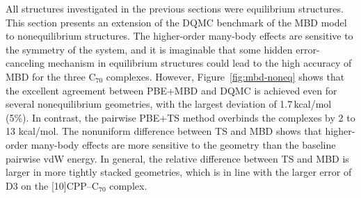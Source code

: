 All structures investigated in the previous sections were equilibrium structures.
This section presents an extension of the DQMC benchmark of the MBD model to nonequilibrium structures.
The higher-order many-body effects are sensitive to the symmetry of the system, and it is imaginable that some hidden error-canceling mechanism in equilibrium structures could lead to the high accuracy of MBD for the three C$_{70}$ complexes.
However, Figure~\ref{fig:mbd-noneq} shows that the excellent agreement between PBE+MBD and DQMC is achieved even for several nonequilibrium geometries, with the largest deviation of 1.7\,kcal/mol (5\%).
In contrast, the pairwise PBE+TS method overbinds the complexes by 2 to 13 kcal/mol.
The nonuniform difference between TS and MBD shows that higher-order many-body effects are more sensitive to the geometry than the baseline pairwise vdW energy.
In general, the relative difference between TS and MBD is larger in more tightly stacked geometries, which is in line with the larger error of D3 on the [10]CPP--C$_{70}$ complex.
